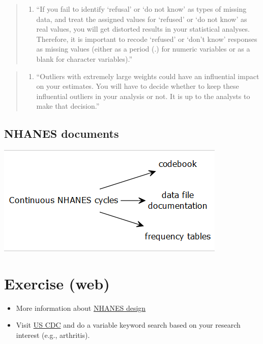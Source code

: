 \documentclass[
]{book}
\providecommand{\tightlist}{%
  \setlength{\itemsep}{0pt}\setlength{\parskip}{0pt}}
\begin{document}
\begin{quote}
\begin{enumerate}
\def\labelenumi{\arabic{enumi}.}
\setcounter{enumi}{1}
\tightlist
\item
  ``If you fail to identify `refusal' or `do not know' as types of missing data, and treat the assigned values for `refused' or `do not know' as real values, you will get distorted results in your statistical analyses. Therefore, it is important to recode `refused' or `don't know' responses as missing values (either as a period (.) for numeric variables or as a blank for character variables).''
\end{enumerate}
\end{quote}

\begin{quote}
\begin{enumerate}
\def\labelenumi{\arabic{enumi}.}
\setcounter{enumi}{2}
\tightlist
\item
  ``Outliers with extremely large weights could have an influential impact on your estimates. You will have to decide whether to keep these influential outliers in your analysis or not. It is up to the analysts to make that decision.''
\end{enumerate}
\end{quote}

\hypertarget{nhanes-documents}{%
\subsection{NHANES documents}\label{nhanes-documents}}

\includegraphics[width=0.65\linewidth]{images/g3}

\hypertarget{exercise-web}{%
\section{Exercise (web)}\label{exercise-web}}

\begin{itemize}
\tightlist
\item
  More information about \href{https://wwwn.cdc.gov/nchs/nhanes/tutorials/module2.aspx}{NHANES design}
\item
  Visit \href{https://wwwn.cdc.gov/Nchs/Nhanes/search/}{US CDC} and do a variable keyword search based on your research interest (e.g., arthritis).
\end{itemize}
\end{document}
